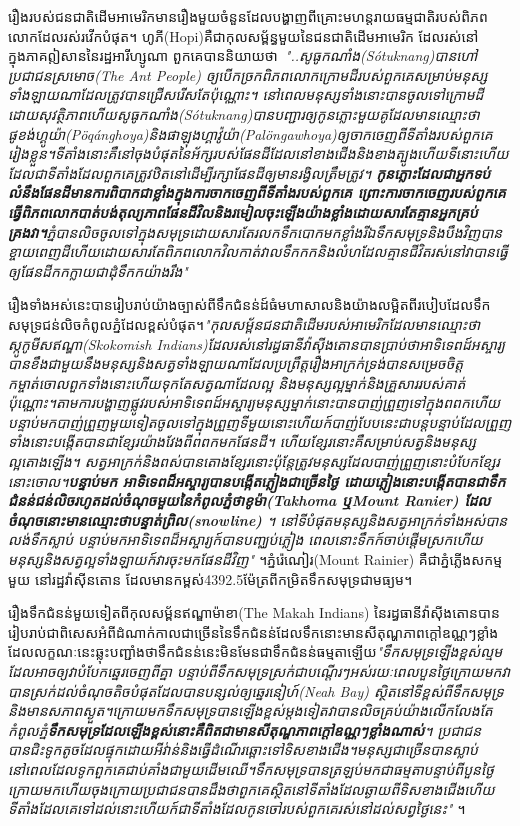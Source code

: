 \documentclass[10pt,twocolumn,letterpaper]{article}
\begin{document}
រឿងរបស់ជនជាតិដើមអាមេរិកមានរឿងមួយចំនួនដែលបង្ហាញពីគ្រោះមហន្តរាយធម្មជាតិរបស់ពិភពលោកដែលរស់រវើកបំផុត។ ហូភី(Hopi)គឺជាកុលសម្ព័ន្ធមួយនៃជនជាតិដើមអាមេរិក ដែលរស់នៅក្នុងភាគឦសាននៃរដ្ឋអារីហ្សូណា ពួកគេបាននិយាយថា\, \textit{"..សូធូកណាំង(Sótuknang)បានហៅប្រជាជនស្រមោច(The Ant People) ឲ្យបើកច្រកពិភពលោកក្រោមដីរបស់ពួកគេសម្រាប់មនុស្សទាំងឡាយណាដែលត្រូវបានជ្រើសរើសតែប៉ុណ្ណោះ។ នៅពេលមនុស្សទាំងនោះបានចូលទៅក្រោមដីដោយសុវត្ថិភាពហើយ​សូធូកណាំង(Sótuknang)បានបញ្ជារឲ្យកូនភ្លោះមួយគូដែលមានឈ្មោះថា​ផូខង់ហ្គូយ៉ា(Pöqánghoya)និង​ផាឡុងហ្គាវ៉ូយ៉ា(Palöngawhoya)ឲ្យចាកចេញពីទីតាំងរបស់ពួកគេរៀងខ្លួន។​ទីតាំងនោះគឺនៅចុងបំផុតនៃអ័ក្សរបស់ផែនដីដែលនៅខាងជើងនិងខាងត្បូង​ហើយទីនោះហើយដែលជាទីតាំងដែលពួកគេត្រូវឋិតនៅដើម្បីរក្សាផែនដីឲ្យមានរង្វិលត្រឹមត្រូវ។ \textbf{កូនភ្លោះដែលជាអ្នកទប់លំនឹងផែនដីមានការពិបាកជាខ្លាំងក្នុងការចាកចេញពីទីតាំងរបស់ពួកគេ ព្រោះការចាកចេញរបស់ពួកគេធ្វើពិភពលោកបាត់បង់តុល្យភាព​ផែនដីវិល​និង​រមៀលចុះឡើងយ៉ាងខ្លាំងដោយសារតែគ្មានអ្នកគ្រប់គ្រងវា។}ភ្នំបានលិចចូលទៅក្នុងសមុទ្រដោយសារតែរលកទឹកបោកមកខ្លាំង​រីឯទឹកសមុទ្រនិងបឹងវិញបានខ្ចាយពេញដី​ហើយដោយសារតែពិភពលោកវិលកាត់វាលទឹកកកនិងលំហដែលគ្មានជីវិតរស់នៅ​វាបានធ្វើឲ្យផែនដីកកក្លាយជាដុំទឹកកយ៉ាងរឹង"} \cite{4}

រឿងទាំងអស់នេះបានរៀបរាប់យ៉ាងច្បាស់ពីទឹកជំនន់ដ៍ធំមហាសាលនិងយ៉ាងលម្អិតពីរបៀបដែលទឹកសមុទ្រជន់លិចកំពូលភ្នំដែលខ្ពស់បំផុត។\textit{"កុលសម្ព័នជនជាតិដើមរបស់អាមេរិកដែលមានឈ្មោះថា​ស្កូកូមីស​ឥណ្ឌា​(Skokomish Indians)ដែលរស់នៅរដ្ធធានីវ៉ាស៊ីងតោនបានប្រាប់ថា​អាទិទេពដ៍អស្ចារ្យបានខឹងជាមួយនឹងមនុស្សនិងសត្វទាំងឡាយណាដែលប្រព្រឹត្តរឿងអាក្រក់​ទ្រង់បានសម្រេចចិត្តកម្ចាត់ចោលពួកទាំងនោះហើយទុកតែសត្វណាដែលល្អ និង​មនុស្សល្អម្នាក់និងគ្រួសាររបស់គាត់ប៉ុណ្ណោះ។តាមការបង្ហាញផ្លូវរបស់អាទិទេពដ៍អស្ចារ្យ​មនុស្សម្នាក់នោះបានបាញ់ព្រួញទៅក្នុងពពក​ហើយបន្ទាប់មកបាញ់ព្រួញមួយទៀតចូលទៅក្នុងព្រួញទីមួយនោះ​ហើយក៍បាញ់បែបនេះជាបន្តបន្ទាប់ដែលព្រួញទាំងនោះបង្កើតបានជាខ្សែរយ៉ាងវែងពីពពកមកផែនដី។ ហើយខ្សែរនោះគឺសម្រាប់សត្វនិងមនុស្សល្អតោងឡើង។ សត្វអាក្រក់និងពស់បានតោងខ្សែរនោះប៉ុន្តែត្រូវមនុស្សដែលបាញ់ព្រួញនោះបំបែកខ្សែរនោះចោល។\textbf{បន្ទាប់មក អាទិទេពដ៏អស្ចារ្យបានបង្កើតភ្លៀងជាច្រើនថ្ងៃ ដោយភ្លៀងនោះបង្កើតបានជាទឹកជំនន់ជន់លិចរហូតដល់ចំណុចមួយនៃកំពូលភ្នំ​ថាខូម៉ា​(Takhoma ឬ​Mount Ranier) ដែលចំណុចនោះមានឈ្មោះថា​បន្ទាត់ព្រិល​(snowline) }។ នៅទីបំផុតមនុស្សនិងសត្វអាក្រក់ទាំងអស់បានលង់ទឹកស្លាប់ បន្ទាប់មកអាទិទេពដ៏អស្ចារ្យក៍បានបញ្ឈប់ភ្លៀង ពេលនោះទឹកក៍ចាប់ផ្តើមស្រកហើយមនុស្សនិងសត្វល្អទាំងឡាយក៍វារចុះមកផែនដីវិញ"} \cite{3}។​ភ្នំរ៉េណៀរ(Mount Rainier) គឺជាភ្នំភ្លើងសកម្មមួយ នៅរដ្ឋវ៉ាស៊ីនតោន ដែលមានកម្ពស់​4392.5ម៉ែត្រពីកម្រិតទឹកសមុទ្រជាមធ្យម។

រឿងទឹកជំនន់មួយទៀតពីកុលសម្ព័នឥណ្ឌា​ម៉ាខា​(The Makah Indians) នៃរដ្ធធានីវ៉ាស៊ីងតោនបានរៀបរាប់ជាពិសេសអំពីដំណាក់កាលជាច្រើននៃទឹកជំនន់ដែលទឹកនោះមានសីតុណ្ហភាពក្តៅឧណ្ណៗខ្លាំង​ដែលលក្ខណៈនេះឆ្លុះបញ្ជាំងថាទឹកជំនន់នេះមិនមែនជាទឹកជំនន់ធម្មតាឡើយ\textit{"ទឹកសមុទ្រឡើងខ្ពស់ល្មមដែលអាចឲ្យវាបំបែកឆ្នេរចេញពីគ្នា បន្ទាប់ពីទឹកសមុទ្រស្រក់ជាបណ្តើរៗ​អស់រយៈពេលបួនថ្ងៃក្រោយមកវាបានស្រក់ដល់ចំណុចតិចបំផុតដែលបានបន្សល់ឲ្យឆ្នេរនៀហ៍(Neah Bay) ស្ថិតនៅទីខ្ពស់ពីទឹកសមុទ្រនិងមានសភាពស្ងួត។ក្រោយមកទឹកសមុទ្របានឡើងខ្ពស់ម្តងទៀត​វាបានលិចគ្រប់យ៉ាងលើកលែងតែកំពូលភ្នំ\textbf{ទឹកសមុទ្រដែលឡើងខ្ពស់នោះគឺពិតជាមានសីតុណ្ហភាពក្តៅឧណ្ណៗខ្លាំងណាស់}។ ប្រជាជនបានជិះទូកតូចដែលផ្ទុកដោយអីវ់ាន់​និង​ធ្វើដំណើរឆ្ពោះទៅទិសខាងជើង។​មនុស្សជាច្រើនបានស្លាប់នៅពេលដែលទូកពួកគេជាប់គាំងជាមួយដើមឈើ។ទឹកសមុទ្របានត្រឡប់មកជាធម្មតាបន្ទាប់ពីបួនថ្ងៃក្រោយមក​ហើយចុងក្រោយប្រជាជនបានដឹងថាពួកគេស្ថិតនៅទីតាំងដែលឆ្ងាយពីទិសខាងជើង​ហើយទីតាំងដែលគេទៅដល់នោះហើយក៍ជាទីតាំងដែលកូនចៅរបស់ពួកគេរស់នៅដល់សព្វថ្ងៃនេះ"} \cite{3}។
\end{document}
